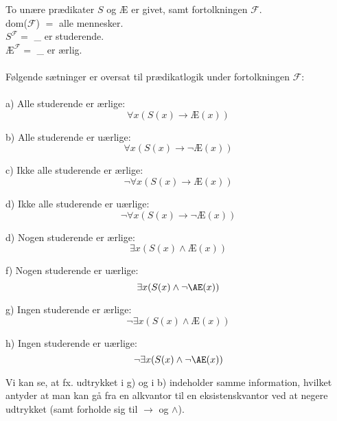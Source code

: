 To unære prædikater $S$ og $Æ$ er givet, samt fortolkningen $\mathcal{F}$. \\

dom($\mathcal{F}$) $=$ alle mennesker.\\
$S^{\mathcal{F}}=$ \_ er studerende. \\
$Æ^{\mathcal{F}}=$ \_ er ærlig. \\
\\
Følgende sætninger er oversat til prædikatlogik under fortolkningen $\mathcal{F}$:\\
\\
a) Alle studerende er ærlige:\\
    $$\forall x(S(x) \rightarrow Æ(x))$$

b) Alle studerende er uærlige:\\
    $$\forall x(S(x) \rightarrow \neg Æ(x))$$
    
c) Ikke alle studerende er ærlige:\\
    $$\neg\forall x(S(x) \rightarrow Æ(x))$$
    
d) Ikke alle studerende er uærlige:\\
    $$\neg\forall x(S(x) \rightarrow \neg Æ(x))$$
    
d) Nogen studerende er ærlige:\\
    $$ \exists x(S(x) \wedge Æ(x))$$

f) Nogen studerende er uærlige:\\
    $$ \exists x(S(x) \wedge \negÆ(x))$$
    
g) Ingen studerende er ærlige:\\
    $$ \neg\exists x(S(x) \wedge Æ(x))$$
    
h) Ingen studerende er uærlige:\\
    $$ \neg\exists x(S(x) \wedge \negÆ(x))$$
    
Vi kan se, at fx. udtrykket i g) og i b) indeholder samme information, hvilket antyder at man kan gå fra en alkvantor til en eksistenskvantor ved at negere udtrykket (samt forholde sig til $\rightarrow$ og $\wedge$).